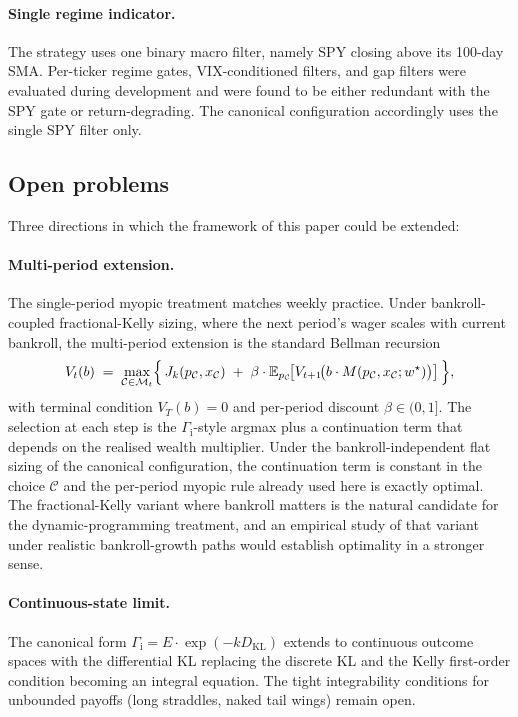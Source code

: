 \documentclass[11pt]{article}
\theoremstyle{definition}
\theoremstyle{remark}
\newcommand{\E}{\mathbb{E}}
\newcommand{\C}{\mathcal{C}}
\newcommand{\KL}{D_{\mathrm{KL}}}
\newcommand{\GROUND}{\Gamma_{\mathrm{i}}}
\begin{document}
\paragraph{Single regime indicator.}
The strategy uses one binary macro filter, namely SPY closing
above its 100-day SMA. Per-ticker regime gates,
VIX-conditioned filters, and gap filters were evaluated during
development and were found to be either redundant with the SPY
gate or return-degrading. The canonical configuration accordingly
uses the single SPY filter only.

\subsection{Open problems}

Three directions in which the framework of this paper could be
extended:

\paragraph{Multi-period extension.}
The single-period myopic treatment matches weekly practice. Under
bankroll-coupled fractional-Kelly sizing, where the next period's
wager scales with current bankroll, the multi-period extension is
the standard Bellman recursion
\begin{equation*}
V_t(b) \;=\; \max_{\C \in \mathcal{M}_t} \Bigl\{\, J_k(p_\C, x_\C)
   \;+\; \beta \cdot \E_{p_\C}\!\bigl[ V_{t+1}\!\bigl(b \cdot M(p_\C, x_\C; w^\star)\bigr) \bigr] \,\Bigr\},
\end{equation*}
with terminal condition $V_T(b) = 0$ and per-period discount
$\beta \in (0, 1]$. The selection at each step is the
$\GROUND$-style argmax plus a continuation term that depends on
the realised wealth multiplier. Under the bankroll-independent
flat sizing of the canonical configuration, the continuation
term is constant in the choice $\C$ and the per-period myopic
rule already used here is exactly optimal. The
fractional-Kelly variant where bankroll matters is the natural
candidate for the dynamic-programming treatment, and an empirical
study of that variant under realistic bankroll-growth paths
would establish optimality in a stronger sense.

\paragraph{Continuous-state limit.}
The canonical form $\GROUND = E \cdot \exp(-k \KL)$ extends to
continuous outcome spaces with the differential KL replacing the
discrete KL and the Kelly first-order condition becoming an
integral equation. The tight integrability conditions for
unbounded payoffs (long straddles, naked tail wings) remain open.
\end{document}
